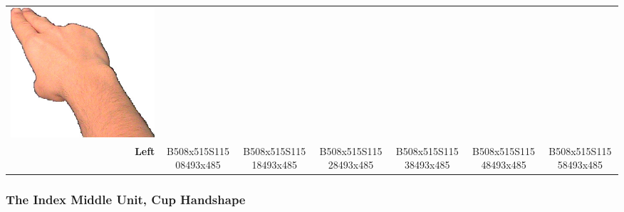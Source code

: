 \documentclass{article}
\begin{document}
\begin{center}
\begin{tabular}{r*{6}{c}}
\includegraphics[scale=0.1]{images/02-03-6.jpg}\\
\textbf{Left}&
B508x515S11508493x485&
B508x515S11518493x485&
B508x515S11528493x485&
B508x515S11538493x485&
B508x515S11548493x485&
B508x515S11558493x485\\
\end{tabular}
\end{center}

\subsubsection{The Index Middle Unit, Cup Handshape}
\end{document}
